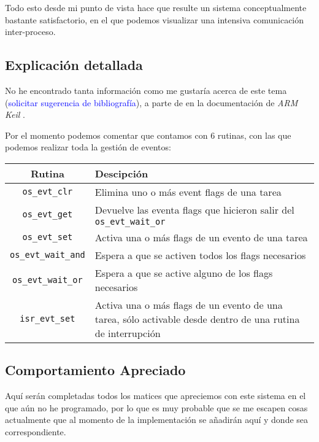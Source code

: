\documentclass[a4paper,openright,12pt]{article}
\begin{document}
Todo esto desde mi punto de vista hace que resulte un sistema conceptualmente bastante satisfactorio, en el que podemos visualizar una intensiva comunicación inter-proceso.

\subsection{Explicación detallada}
No he encontrado tanta información como me gustaría acerca de este tema (\textcolor{blue}{solicitar sugerencia de bibliografía}), a parte de en la documentación de \emph{ARM
Keil} \autocite[]{keil_function_reference}.

Por el momento podemos comentar que contamos con 6 rutinas, con las que podemos realizar toda la gestión de eventos:
\begin{samepage}
\begin{center}
\begin{tabular}{ | c | >{\centering\arraybackslash}m{11cm} | }
    \hline
    Rutina              &   Descipción\\
    \hline
    \texttt{os\_evt\_clr}        &   Elimina uno o más event flags de una tarea\\
    \hline
    \texttt{os\_evt\_get}        &   Devuelve las eventa flags que hicieron salir del \texttt{os\_evt\_wait\_or}\\
    \hline
    \texttt{os\_evt\_set}        &   Activa una o más flags de un evento de una tarea\\
    \hline
    \texttt{os\_evt\_wait\_and}  &   Espera a que se activen todos los flags necesarios\\
    \hline
    \texttt{os\_evt\_wait\_or}   &   Espera a que se active alguno de los flags necesarios\\
    \hline
    \texttt{isr\_evt\_set}       &   Activa una o más flags de un evento de una tarea, sólo activable desde dentro de una rutina de interrupción\\
    \hline
\end{tabular}
\end{center}
\end{samepage}

\subsection{Comportamiento Apreciado}
Aquí serán completadas todos los matices que apreciemos con este sistema en el que aún no he programado, por lo que es muy probable que se me
escapen cosas actualmente que al momento de la implementación se añadirán aquí y donde sea correspondiente.


\clearpage
\begin{flushleft}
\printbibliography[]{}
\end{flushleft}
\end{document}
